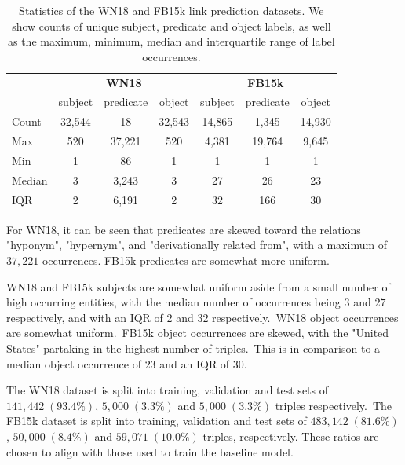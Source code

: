 \begin{table}[H]
	\begin{center}
	\begin{tabular}{|l|ccc|ccc|}
		\hline
 		& \multicolumn{3}{c|}{\textbf{WN18}} & \multicolumn{3}{c|}{\textbf{FB15k}} \\
		& subject & predicate & object & subject & predicate & object \\
		\hline 
		Count & 32,544 & 18 & 32,543 & 14,865 & 1,345 & 14,930 \\
		Max & 520 & 37,221 & 520 & 4,381 & 19,764 & 9,645 \\
		Min & 1 & 86 & 1 & 1 & 1 & 1 \\
		Median & 3 & 3,243 & 3 & 27 & 26 & 23 \\
		IQR & 2 & 6,191 & 2 & 32 & 166 & 30 \\
		\hline 
	\end{tabular}
	\end{center}
	\captionsetup{justification=centering}
	\caption{Statistics of the WN18 and FB15k link prediction datasets. We show counts of unique subject, predicate and object labels, as well as the maximum, minimum, median and interquartile range of label occurrences.}
\end{table}

\noindent For WN18, it can be seen that predicates are skewed toward the relations "hyponym",  "hypernym", and "derivationally related from", with a maximum of $ 37, 221 $ occurrences. FB15k predicates are somewhat more uniform. \par

\noindent WN18 and FB15k subjects are somewhat uniform aside from a small number of high occurring entities, with the median number of occurrences being $ 3 $ and $ 27 $ respectively, and with an IQR of $ 2 $ and $ 32 $ respectively.\ WN18 object occurrences are somewhat uniform.\ FB15k object occurrences are skewed, with the "United States" partaking in the highest number of triples.\ This is in comparison to a median object occurrence of $ 23 $ and an IQR of 30. \par

\noindent The WN18 dataset is split into training, validation and test sets of $ 141, 442 \; (93.4 \%) $, $ 5, 000 \; (3.3 \%) $ and $ 5, 000 \; (3.3 \%) $ triples respectively.\ The FB15k dataset is split into training, validation and test sets of $ 483, 142 \; (81.6 \%) $, $ 50, 000 \; (8.4 \%) $ and $ 59, 071 \; (10.0 \%) $ triples, respectively. These ratios are chosen to align with those used to train the baseline model.

